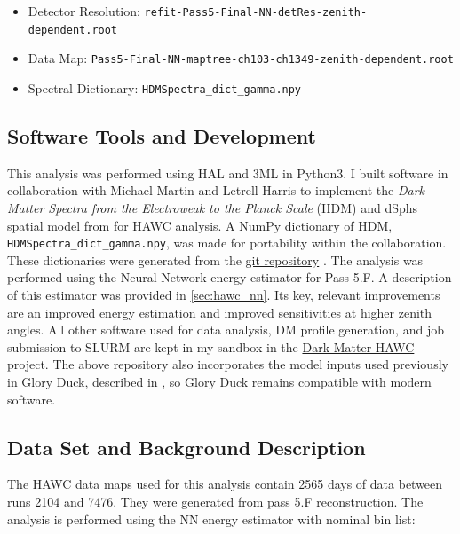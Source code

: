 \begin{itemize}
    \item Detector Resolution: \texttt{refit-Pass5-Final-NN-detRes-zenith-dependent.root}
    \item Data Map: \texttt{Pass5-Final-NN-maptree-ch103-ch1349-zenith-dependent.root}
    \item Spectral Dictionary: \texttt{HDMSpectra\_dict\_gamma.npy}
\end{itemize}

\subsection{Software Tools and Development}\label{sec:mtd_tools}

This analysis was performed using HAL and 3ML \cite{Abeysekara_2017, vianello2015multimission} in Python3.
I built software in collaboration with Michael Martin and Letrell Harris to implement the \emph{Dark Matter Spectra from the Electroweak to the Planck Scale} (HDM) \cite{Rodd:HDM_spec} and dSphs spatial model from \cite{DM_Strigari20} for HAWC analysis.
A NumPy dictionary of HDM, \texttt{HDMSpectra\_dict\_gamma.npy}, was made for portability within the collaboration.
These dictionaries were generated from the \href{https://github.com/nickrodd/HDMSpectra/tree/master}{git repository} \cite{Rodd:HDM_spec}.
The analysis was performed using the Neural Network energy estimator for Pass 5.F.
A description of this estimator was provided in \cref{sec:hawc_nn}. Its key, relevant improvements are an improved energy estimation and improved sensitivities at higher zenith angles.
All other software used for data analysis, DM profile generation, and job submission to SLURM are kept in my sandbox in the \href{https://gitlab.com/hawc-observatory/sandboxes/salaza82/dark_matter_hawc}{Dark Matter HAWC} project.
The above repository also incorporates the model inputs used previously in Glory Duck, described in , so Glory Duck remains compatible with modern software.

\subsection{Data Set and Background Description} \label{sec:mtd_data_bkgd}

The HAWC data maps used for this analysis contain 2565 days of data between runs 2104 and 7476.
They were generated from pass 5.F reconstruction.
The analysis is performed using the NN energy estimator with nominal bin list:

